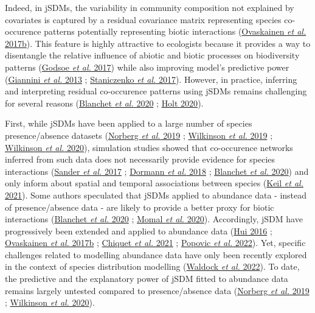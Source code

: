\documentclass[9pt,biorxiv,doublespacing,lineno]{lapreprint}
\begin{document}
Indeed, in jSDMs, the variability in community composition not explained
by covariates is captured by a residual covariance matrix representing
species co-occurence patterns potentially representing biotic
interactions (\protect\hyperlink{ref-Ovaskainen_2017a}{Ovaskainen
\emph{et al.} 2017b}). This feature is highly attractive to ecologists
because it provides a way to disentangle the relative influence of
abiotic and biotic processes on biodiversity patterns
(\protect\hyperlink{ref-Godsoe_2017}{Godsoe \emph{et al.} 2017}) while
also improving model's predictive power
(\protect\hyperlink{ref-Giannini_2013}{Giannini \emph{et al.} 2013} ;
\protect\hyperlink{ref-Staniczenko_2017}{Staniczenko \emph{et al.}
2017}). However, in practice, inferring and interpreting residual
co-occurence patterns using jSDMs remains challenging for several
reasons (\protect\hyperlink{ref-Blanchet_2020}{Blanchet \emph{et al.}
2020} ; \protect\hyperlink{ref-Holt_2020}{Holt 2020}).

First, while jSDMs have been applied to a large number of species
presence/absence datasets (\protect\hyperlink{ref-Norberg_2019}{Norberg
\emph{et al.} 2019} ; \protect\hyperlink{ref-Wilkinson_2019}{Wilkinson
\emph{et al.} 2019} ; \protect\hyperlink{ref-Wilkinson_2020}{Wilkinson
\emph{et al.} 2020}), simulation studies showed that co-occurence
networks inferred from such data does not necessarily provide evidence
for species interactions (\protect\hyperlink{ref-Sander_2017}{Sander
\emph{et al.} 2017} ; \protect\hyperlink{ref-Dormann_2018}{Dormann
\emph{et al.} 2018} ; \protect\hyperlink{ref-Blanchet_2020}{Blanchet
\emph{et al.} 2020}) and only inform about spatial and temporal
associations between species (\protect\hyperlink{ref-Keil_2021}{Keil
\emph{et al.} 2021}). Some authors speculated that jSDMs applied to
abundance data - instead of presence/absence data - are likely to
provide a better proxy for biotic interactions
(\protect\hyperlink{ref-Blanchet_2020}{Blanchet \emph{et al.} 2020} ;
\protect\hyperlink{ref-Momal_2020}{Momal \emph{et al.} 2020}).
Accordingly, jSDM have progressively been extended and applied to
abundance data (\protect\hyperlink{ref-Hui_2016}{Hui 2016} ;
\protect\hyperlink{ref-Ovaskainen_2017a}{Ovaskainen \emph{et al.} 2017b}
; \protect\hyperlink{ref-Chiquet_2021}{Chiquet \emph{et al.} 2021} ;
\protect\hyperlink{ref-Popovic_2022}{Popovic \emph{et al.} 2022}). Yet,
specific challenges related to modelling abundance data have only been
recently explored in the context of species distribution modelling
(\protect\hyperlink{ref-Waldock_2022}{Waldock \emph{et al.} 2022}). To
date, the predictive and the explanatory power of jSDM fitted to
abundance data remains largely untested compared to presence/absence
data (\protect\hyperlink{ref-Norberg_2019}{Norberg \emph{et al.} 2019} ;
\protect\hyperlink{ref-Wilkinson_2020}{Wilkinson \emph{et al.} 2020}).
\end{document}
